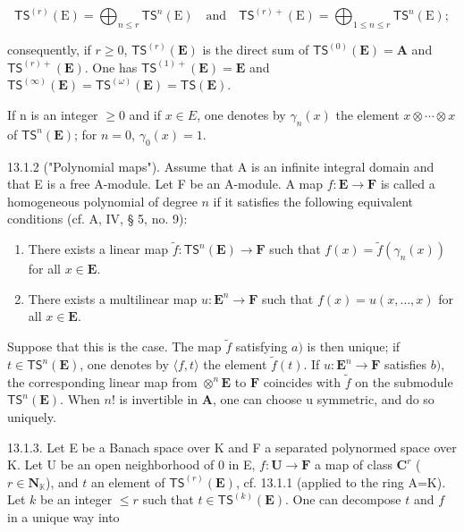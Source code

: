 \[
\mathsf{TS}^{(r)}(\mathrm{E})=\bigoplus_{n\leqslant r}\mathsf{TS}^{n}(\mathrm{E})\quad\text{and}\quad\mathsf{TS}^{(r)+}(\mathrm{E})=\bigoplus_{1\leqslant n\leqslant r}\mathsf{TS}^{n}(\mathrm{E});
\]

consequently, if \(r \geqslant 0\), \(\mathsf{TS}^{(r)}(\mathbf{E})\) is the direct sum of \(\mathsf{TS}^{(0)}(\mathbf{E}) = \mathbf{A}\) and \(\mathsf{TS}^{(r)+}(\mathbf{E})\). One has \(\mathsf{TS}^{(1)+}(\mathbf{E}) = \mathbf{E}\) and \(\mathsf{TS}^{(\infty)}(\mathbf{E}) = \mathsf{TS}^{(\omega)}(\mathbf{E}) = \mathsf{TS}(\mathbf{E})\).

If n is an integer \(\geqslant0\) and if \(x\in E\), one denotes by \(\gamma_{n}(x)\) the element \(x\otimes\cdots\otimes x\) of \(\mathsf{TS}^{n}(\mathbf{E})\); for \(n=0\), \(\gamma_{0}(x)=1\).

13.1.2 ("Polynomial maps"). Assume that A is an infinite integral domain and that E is a free A-module. Let F be an A-module. A map \(f\colon\mathbf{E}\to\mathbf{F}\) is called a homogeneous polynomial of degree \(n\) if it satisfies the following equivalent conditions (cf. A, IV, § 5, no. 9):

\begin{enumerate}
\def\labelenumi{\alph{enumi})}
\item
  There exists a linear map \(\tilde{f}\colon\mathsf{TS}^{n}(\mathbf{E})\to\mathbf{F}\) such that \(f(x)=\tilde{f}(\gamma_{n}(x))\) for all \(x\in\mathbf{E}\).
\item
  There exists a multilinear map \(u: \mathbf{E}^{n} \to \mathbf{F}\) such that \(f(x) = u(x, \ldots, x)\) for all \(x \in \mathbf{E}\).
\end{enumerate}

Suppose that this is the case. The map \(\tilde{f}\) satisfying \(a)\) is then unique; if \(t \in \mathsf{TS}^n(\mathbf{E})\), one denotes by \(\langle f, t \rangle\) the element \(\tilde{f}(t)\). If \(u: \mathbf{E}^n \to \mathbf{F}\) satisfies \(b)\), the corresponding linear map from \(\otimes^n\mathbf{E}\) to \(\mathbf{F}\) coincides with \(\tilde{f}\) on the submodule \(\mathsf{TS}^n(\mathbf{E})\). When \(n!\) is invertible in \(\mathbf{A}\), one can choose u symmetric, and do so uniquely.

13.1.3. Let E be a Banach space over K and F a separated polynormed space over K. Let U be an open neighborhood of 0 in E, \(f\colon\mathbf{U}\to\mathbf{F}\) a map of class \(\mathbf{C}^{r}\) (\(r\in\mathbf{N}_{\mathbb{K}}\)), and \(t\) an element of \(\mathsf{TS}^{(r)}(\mathbf{E})\), cf. 13.1.1 (applied to the ring A=K). Let \(k\) be an integer \(\leqslant r\) such that \(t\in\mathsf{TS}^{(k)}(\mathbf{E})\). One can decompose \(t\) and \(f\) in a unique way into

